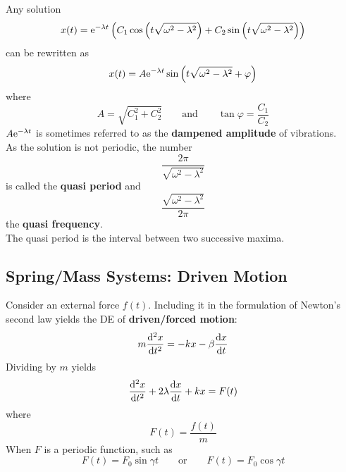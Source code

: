 \documentclass[./Differential Equations.tex]{subfiles}
\begin{document}
				Any solution
					\[x(t) = \text{e}^{-\lambda t}\left(C_1\cos\left(t\sqrt{\omega^2 - \lambda^2}\right) + C_2\sin\left(t\sqrt{\omega^2 - \lambda^2}\right)\right)\]
					can be rewritten as
					\[x(t) = A\text{e}^{-\lambda t}\sin\left(t\sqrt{\omega^2 - \lambda^2} + \varphi\right)\]
					where
					\[
						A = \sqrt{C_1^2 + C_2^2} \qquad \text{and} \qquad
						\tan\varphi = \frac{C_1}{C_2}
					\]
					\(A\text{e}^{-\lambda t}\) is sometimes referred to as the \textbf{dampened amplitude} of vibrations. \\
				As the solution is not periodic, the number
					\[\frac{2\pi}{\sqrt{\omega^2 - \lambda^2}}\]	
					is called the \textbf{quasi period} and
					\[\frac{\sqrt{\omega^2 - \lambda^2}}{2\pi}\]
					the \textbf{quasi frequency}. \\
					The quasi period is the interval between two successive maxima.
		\subsection{Spring/Mass Systems: Driven Motion}
				Consider an external force \(f(t)\). Including it in the formulation of Newton's second law yields the DE of \textbf{driven/forced motion}:
					\[m\dv[2]{x}{t} = -kx - \beta\dv{x}{t}\]
					Dividing by \(m\) yields
					\[\dv[2]{x}{t} + 2\lambda\dv{x}{t} + kx = F(t)\]
					where 
					\[F(t) = \frac{f(t)}{m}\]
				When \(F\) is a periodic function, such as
					\[F(t) = F_0\sin\gamma t \qquad \text{or} \qquad F(t) = F_0\cos\gamma t\]
\end{document}
